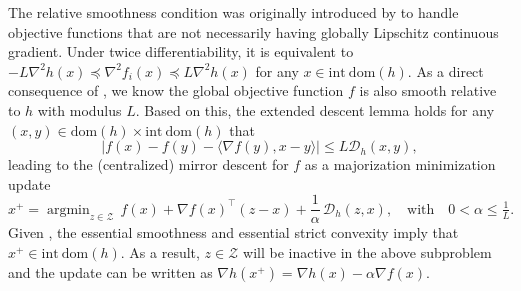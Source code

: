 \documentclass{article}
\theoremstyle{plain}
\theoremstyle{definition}
\theoremstyle{remark}
\DeclareMathOperator*{\argmin}{argmin}
\newcommand{\sL}{L}
\newcommand{\cZ}{\mathcal{Z}}
\newcommand{\cD}{\mathcal{D}_{h}}
\newcommand{\dom}[1]{\mathrm{dom}(#1)}
\newcommand{\idom}[1]{\mathrm{int\ dom}(#1)}
\newcommand{\iprod}[2]{\langle #1, #2 \rangle}
\begin{document}
The relative smoothness condition was originally introduced by \cite{bauschke2017descent,lu2018relatively} to handle objective functions that are not necessarily having globally Lipschitz continuous gradient. Under twice differentiability, it is equivalent to $-\sL \nabla^2 h(x)\preceq \nabla^2 f_i(x)\preceq \sL \nabla^2h(x)$ for any $x\in\idom{h}$. As a direct consequence of , we know the global objective function $f$ is also smooth relative to $h$ with modulus $\sL$. Based on this, the extended descent lemma \cite{bauschke2017descent,bolte2018first,lu2018relatively} holds for any $(x,y)\in \dom{h}\times \idom{h}$ that 
\begin{equation}\label{eq:extended descent}
\big|f(x) - f(y) - \iprod{\nabla f(y)}{x-y}\big| \leq \sL \cD(x,y), 
\end{equation}
leading to the (centralized) mirror descent for $f$ as a majorization minimization update\vspace{-0.2cm} 
\[
    x^+=\argmin_{z\in\cZ} \, f(x)+\nabla f(x)^\top (z-x) + \frac{1}{\alpha}\, \cD(z,x), \quad \text{with} \quad 0< \alpha \leq \tfrac1\sL. \]
Given , the essential smoothness and essential strict convexity imply that $x^+\in\idom{h}$. As a result, $z\in\cZ$ will be inactive in the above subproblem and the update can be written as $\nabla h(x^+) = \nabla h(x) - \alpha\nabla f(x)$.
\end{document}
